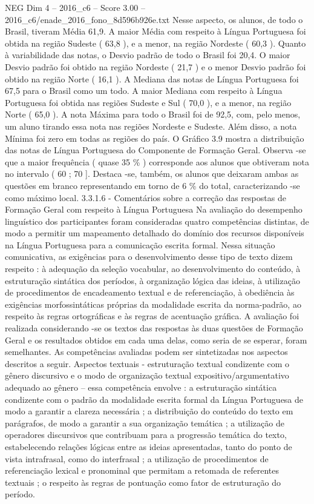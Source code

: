 \begin{textsample}{NEG Dim 4 – 2016\_c6 – Score 3.00 – 2016\_c6/enade\_2016\_fono\_8d596b926e.txt}
Nesse aspecto, os alunos, de todo o Brasil, tiveram Média 61,9.
A maior Média com respeito à Língua Portuguesa foi obtida na região Sudeste ( 63,8 ), e a menor, na região Nordeste ( 60,3 ).
Quanto à variabilidade das notas, o Desvio padrão de todo o Brasil foi 20,4.
O maior Desvio padrão foi obtido na região Nordeste ( 21,7 ) e o menor Desvio padrão foi obtido na região Norte ( 16,1 ).
A Mediana das notas de Língua Portuguesa foi 67,5 para o Brasil como um todo.
A maior Mediana com respeito à Língua Portuguesa foi obtida nas regiões Sudeste e Sul ( 70,0 ), e a menor, na região Norte ( 65,0 ).
A nota Máxima para todo o Brasil foi de 92,5, com, pelo menos, um aluno tirando essa nota nas regiões Nordeste e Sudeste.
Além disso, a nota Mínima foi zero em todas as regiões do país.
O Gráfico 3.9 mostra a distribuição das notas de Língua Portuguesa do Componente de Formação Geral.
Observa -se que a maior frequência ( quase 35 \% ) corresponde aos alunos que obtiveram nota no intervalo ( 60 ; 70 ].
Destaca -se, também, os alunos que deixaram ambas as questões em branco representando em torno de 6 \% do total, caracterizando -se como máximo local. 3.3.1.6 - Comentários sobre a correção das respostas de Formação Geral com respeito à Língua Portuguesa Na avaliação do desempenho linguístico dos participantes foram consideradas quatro competências distintas, de modo a permitir um mapeamento detalhado do domínio dos recursos disponíveis na Língua Portuguesa para a comunicação escrita formal.
Nessa situação comunicativa, as exigências para o desenvolvimento desse tipo de texto dizem respeito : à adequação da seleção vocabular, ao desenvolvimento do conteúdo, à estruturação sintática dos períodos, à organização lógica das ideias, à utilização de procedimentos de encadeamento textual e de referenciação, à obediência às exigências morfossintáticas próprias da modalidade escrita da norma-padrão, ao respeito às regras ortográficas e às regras de acentuação gráfica.
A avaliação foi realizada considerando -se os textos das respostas às duas questões de Formação Geral e os resultados obtidos em cada uma delas, como seria de se esperar, foram semelhantes.
As competências avaliadas podem ser sintetizadas nos aspectos descritos a seguir.
Aspectos textuais - estruturação textual condizente com o gênero discursivo e o modo de organização textual expositivo/argumentativo adequado ao gênero – essa competência envolve : a estruturação sintática condizente com o padrão da modalidade escrita formal da Língua Portuguesa de modo a garantir a clareza necessária ; a distribuição do conteúdo do texto em parágrafos, de modo a garantir a sua organização temática ; a utilização de operadores discursivos que contribuam para a progressão temática do texto, estabelecendo relações lógicas entre as ideias apresentadas, tanto do ponto de vista intrafrasal, como do interfrasal ; a utilização de procedimentos de referenciação lexical e pronominal que permitam a retomada de referentes textuais ; o respeito às regras de pontuação como fator de estruturação do período.

\end{textsample}
